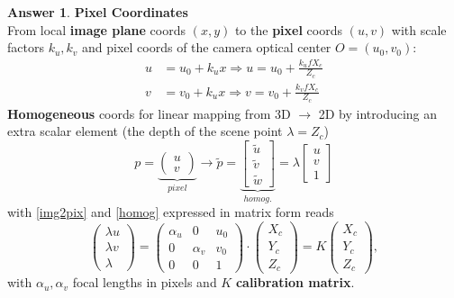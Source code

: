\documentclass[a4paper,12 pt]{article}
\theoremstyle{definition}
\theoremstyle{remark}
\theoremstyle{definition}
\theoremstyle{definition}
\theoremstyle{definition}
\theoremstyle{definition}
\theoremstyle{remark}
\theoremstyle{remark}
\theoremstyle{definition}
\theoremstyle{definition}
\newtheorem*{answer}{Answer}
\begin{document}
\begin{enumerate}
\begin{enumerate}
\begin{answer}
\textbf{Pixel Coordinates}\\
From local \textbf{image plane} coords $(x,y)$ to the \textbf{pixel} coords $(u,v)$ with scale factors $k_u , k_v$ and pixel coords of the camera optical center $O=(u_0,v_0)$:
\begin{equation}\label{img2pix}
\begin{split}
u&=u_0+k_ux \Rightarrow u=u_0+\frac{k_ufX_c}{Z_c}\\
v&=v_0+k_ux \Rightarrow v=v_0+\frac{k_vfX_c}{Z_c}
\end{split}
\end{equation}
\textbf{Homogeneous} coords for linear mapping from 3D $\rightarrow$ 2D by introducing an extra scalar element (the depth of the scene point $\lambda=Z_c$) 
\begin{equation}\label{homog}
p= \underbrace{\begin{pmatrix}
u \\
v
\end{pmatrix}}_{pixel}\rightarrow 
\tilde{p}= 
\underbrace{\begin{bmatrix}
\tilde{u} \\
\tilde{v}\\
\tilde{w}
\end{bmatrix}}_{homog.}=\lambda
\begin{bmatrix}
u \\
v\\
1
\end{bmatrix}
\end{equation}
with \eqref{img2pix} and \eqref{homog} expressed in matrix form reads
\begin{equation}
\begin{pmatrix}
\lambda u\\
\lambda v\\
\lambda 
\end{pmatrix}=\begin{pmatrix}
\alpha _u&0&u_0\\
0&\alpha_v &v_0 \\
0&0&1
\end{pmatrix}\cdot \begin{pmatrix}
X_c\\
Y_c\\
Z_c
\end{pmatrix}=K\begin{pmatrix}
X_c\\
Y_c\\
Z_c
\end{pmatrix},
\end{equation}
with $\alpha _u,\alpha_v$ focal lengths in pixels and $K$ \textbf{calibration matrix}.


\end{answer}
\end{enumerate}
\end{enumerate}
\end{document}
